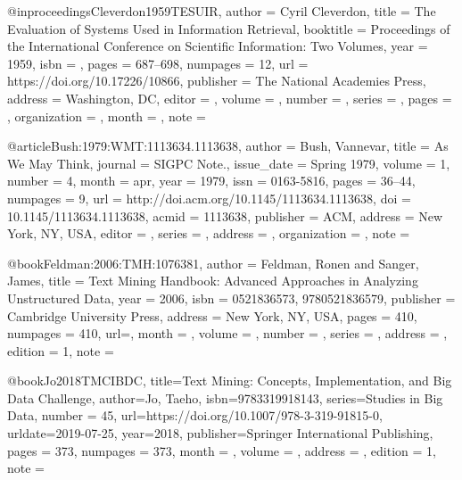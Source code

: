 @inproceedings{Cleverdon1959TESUIR,
    author = {Cyril Cleverdon},
    title = {{T}he {E}valuation of {S}ystems {U}sed in {I}nformation {R}etrieval},
    booktitle = {Proceedings of the International Conference on Scientific
Information: Two Volumes},
    year = {1959},
    isbn = {},
    pages = {687--698},
    numpages = {12},
    url = {https://doi.org/10.17226/10866},
    publisher = {The National Academies Press},
    address = {Washington, DC},
    editor		= {},
    volume		= {},
    number		= {},
    series		= {},
    pages		= {},
    organization	= {},
    month		= {},
    note		= {}
} 

@article{Bush:1979:WMT:1113634.1113638,
    author = {Bush, Vannevar},
    title = {{A}s {W}e {M}ay {T}hink},
    journal = {SIGPC Note.},
    issue_date = {Spring 1979},
    volume = {1},
    number = {4},
    month = apr,
    year = {1979},
    issn = {0163-5816},
    pages = {36--44},
    numpages = {9},
    url = {http://doi.acm.org/10.1145/1113634.1113638},
    doi = {10.1145/1113634.1113638},
    acmid = {1113638},
    publisher = {ACM},
    address = {New York, NY, USA},
    editor		= {},
    series		= {},
    address	= {},
    organization	= {},
    note		= {}
} 

@book{Feldman:2006:TMH:1076381,
    author = {Feldman, Ronen and Sanger, James},
    title = {Text Mining Handbook: Advanced Approaches in Analyzing Unstructured Data},
    year = {2006},
    isbn = {0521836573, 9780521836579},
    publisher = {Cambridge University Press},
    address = {New York, NY, USA},
    pages = {410},
    numpages = {410},
    url={},
    month = {},
    volume   = {},
    number   = {},
    series   = {},
    address  = {},
    edition  = {1},
    note     = {}
} 

@book{Jo2018TMCIBDC,
    title={Text Mining: Concepts, Implementation, and Big Data Challenge},
    author={Jo, Taeho},
    isbn={9783319918143},
    series={Studies in Big Data},
    number   = {45},
    url={https://doi.org/10.1007/978-3-319-91815-0},
    urldate={2019-07-25},
    year={2018},
    publisher={Springer International Publishing},
    pages = {373},
    numpages = {373},
    month = {},
    volume   = {},
    address  = {},
    edition  = {1},
    note     = {}
}

